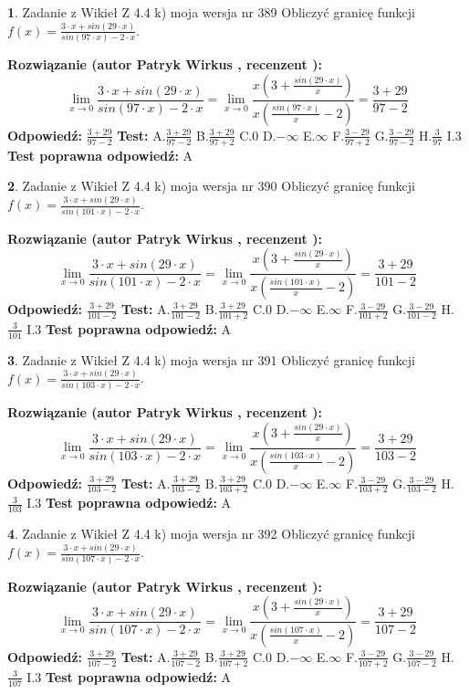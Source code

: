 \documentclass[12pt, a4paper]{article}
\theoremstyle{definition} %
\newtheorem{zad}{}
\newcommand{\zadStart}[1]{\begin{zad}#1\newline}
\newcommand{\zadStop}{\end{zad}}
\newcommand{\rozwStart}[2]{\noindent \textbf{Rozwiązanie (autor #1 , recenzent #2): }\newline}
\newcommand{\rozwStop}{\newline}
\newcommand{\odpStart}{\noindent \textbf{Odpowiedź:}\newline}
\newcommand{\odpStop}{\newline}
\newcommand{\testStart}{\noindent \textbf{Test:}\newline}
\newcommand{\testStop}{\newline}
\newcommand{\kluczStart}{\noindent \textbf{Test poprawna odpowiedź:}\newline}
\newcommand{\kluczStop}{\newline}
\begin{document}
\zadStart{Zadanie z Wikieł Z 4.4 k) moja wersja nr 389}
Obliczyć granicę funkcji $f(x)=\frac{3\cdot x +sin(29\cdot x)}{sin(97\cdot x) -2\cdot x}$.
\zadStop
\rozwStart{Patryk Wirkus}{}
$$\lim\limits_{x\to 0}\frac{3\cdot x +sin(29\cdot x)}{sin(97\cdot x) -2\cdot x}
=\lim\limits_{x\to 0}\frac{x(3+\frac{sin(29\cdot x)}{x})}{x(\frac{sin(97\cdot x)}{x}-2)}
=\frac{3+29}{97-2}$$
\rozwStop
\odpStart
$\frac{3+29}{97-2}$
\odpStop
\testStart
A.$\frac{3+29}{97-2}$
B.$\frac{3+29}{97+2}$
C.$0$
D.$-\infty$
E.$\infty$
F.$\frac{3-29}{97+2}$
G.$\frac{3-29}{97-2}$
H.$\frac{3}{97}$
I.$3$
\testStop
\kluczStart
A
\kluczStop



\zadStart{Zadanie z Wikieł Z 4.4 k) moja wersja nr 390}
Obliczyć granicę funkcji $f(x)=\frac{3\cdot x +sin(29\cdot x)}{sin(101\cdot x) -2\cdot x}$.
\zadStop
\rozwStart{Patryk Wirkus}{}
$$\lim\limits_{x\to 0}\frac{3\cdot x +sin(29\cdot x)}{sin(101\cdot x) -2\cdot x}
=\lim\limits_{x\to 0}\frac{x(3+\frac{sin(29\cdot x)}{x})}{x(\frac{sin(101\cdot x)}{x}-2)}
=\frac{3+29}{101-2}$$
\rozwStop
\odpStart
$\frac{3+29}{101-2}$
\odpStop
\testStart
A.$\frac{3+29}{101-2}$
B.$\frac{3+29}{101+2}$
C.$0$
D.$-\infty$
E.$\infty$
F.$\frac{3-29}{101+2}$
G.$\frac{3-29}{101-2}$
H.$\frac{3}{101}$
I.$3$
\testStop
\kluczStart
A
\kluczStop



\zadStart{Zadanie z Wikieł Z 4.4 k) moja wersja nr 391}
Obliczyć granicę funkcji $f(x)=\frac{3\cdot x +sin(29\cdot x)}{sin(103\cdot x) -2\cdot x}$.
\zadStop
\rozwStart{Patryk Wirkus}{}
$$\lim\limits_{x\to 0}\frac{3\cdot x +sin(29\cdot x)}{sin(103\cdot x) -2\cdot x}
=\lim\limits_{x\to 0}\frac{x(3+\frac{sin(29\cdot x)}{x})}{x(\frac{sin(103\cdot x)}{x}-2)}
=\frac{3+29}{103-2}$$
\rozwStop
\odpStart
$\frac{3+29}{103-2}$
\odpStop
\testStart
A.$\frac{3+29}{103-2}$
B.$\frac{3+29}{103+2}$
C.$0$
D.$-\infty$
E.$\infty$
F.$\frac{3-29}{103+2}$
G.$\frac{3-29}{103-2}$
H.$\frac{3}{103}$
I.$3$
\testStop
\kluczStart
A
\kluczStop



\zadStart{Zadanie z Wikieł Z 4.4 k) moja wersja nr 392}
Obliczyć granicę funkcji $f(x)=\frac{3\cdot x +sin(29\cdot x)}{sin(107\cdot x) -2\cdot x}$.
\zadStop
\rozwStart{Patryk Wirkus}{}
$$\lim\limits_{x\to 0}\frac{3\cdot x +sin(29\cdot x)}{sin(107\cdot x) -2\cdot x}
=\lim\limits_{x\to 0}\frac{x(3+\frac{sin(29\cdot x)}{x})}{x(\frac{sin(107\cdot x)}{x}-2)}
=\frac{3+29}{107-2}$$
\rozwStop
\odpStart
$\frac{3+29}{107-2}$
\odpStop
\testStart
A.$\frac{3+29}{107-2}$
B.$\frac{3+29}{107+2}$
C.$0$
D.$-\infty$
E.$\infty$
F.$\frac{3-29}{107+2}$
G.$\frac{3-29}{107-2}$
H.$\frac{3}{107}$
I.$3$
\testStop
\kluczStart
A
\kluczStop
\end{document}
